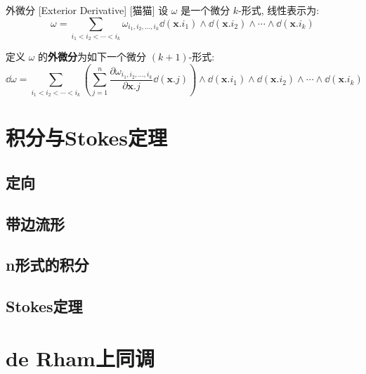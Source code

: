 \documentclass[UTF8]{ctexart}
\begin{document}
        \begin{dfn}
            []
            {外微分}
            [Exterior Derivative]
            [猫猫]
            设 \(\omega\) 是一个微分 \(k\)-形式, 线性表示为: 
            \[\omega=\sum_{i_1<i_2<\cdots<i_k}\omega_{i_1,i_2,\dots,i_k}\dd(\bm{x}.i_1)\wedge\dd(\bm{x}.i_2)\wedge\cdots\wedge\dd(\bm{x}.i_k)\]

            定义 \(\omega\) 的\textbf{外微分}为如下一个微分 \((k+1)\)-形式: 
            \[\dd\omega=\sum_{i_1<i_2<\cdots<i_k}\left(\sum_{j=1}^n\frac{\partial \omega_{i_1,i_2,\dots,i_k}}{\partial \bm{x}.j}\dd(\bm{x}.j)\right)\wedge\dd(\bm{x}.i_1)\wedge\dd(\bm{x}.i_2)\wedge\cdots\wedge\dd(\bm{x}.i_k)\]
        \end{dfn}

\section{积分与Stokes定理}

    \subsection{定向}

    \subsection{带边流形}

    \subsection{n形式的积分}

    \subsection{Stokes定理}
    
\section{de Rham上同调}

    
\end{document}
